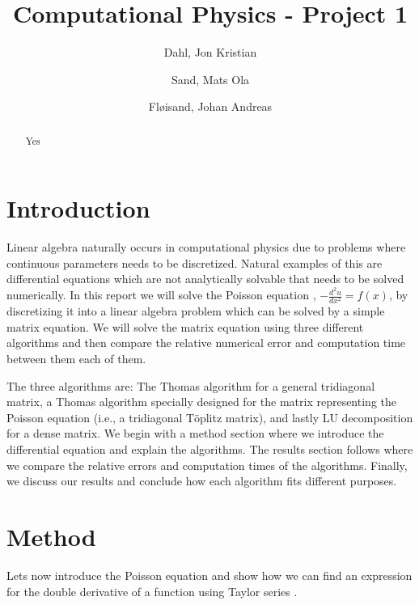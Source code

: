 \documentclass{emulateapj}
\begin{document}
\title{Computational Physics - Project 1}

\author{
  Dahl, Jon Kristian \\
  \and
  Sand, Mats Ola \\
  \and
  Fløisand, Johan Andreas \\
}

\begin{abstract}
Yes
\end{abstract}
 
\section{Introduction}
Linear algebra naturally occurs in computational physics due to problems where continuous parameters needs to be discretized. Natural examples of this are differential equations which are not analytically solvable that needs to be solved numerically. In this report we will solve the Poisson equation \cite[Chapter 13]{matmet}, \(-\frac{d^2u}{dx^2} = f(x)\), by discretizing it into a linear algebra problem which can be solved by a simple matrix equation. We will solve the matrix equation using three different algorithms and then compare the relative numerical error and computation time between them each of them.

The three algorithms are: The Thomas algorithm for a general tridiagonal matrix, a Thomas algorithm specially designed for the matrix representing the Poisson equation (i.e., a tridiagonal T\"{o}plitz matrix), and lastly LU decomposition for a dense matrix.
\newline
\newline
We begin with a method section where we introduce the differential equation and explain the algorithms. The results section follows where we compare the relative errors and computation times of the algorithms. Finally, we discuss our results and conclude how each algorithm fits different purposes.
\section{Method}
Lets now introduce the Poisson equation and show how we can find an expression for the double derivative of a function using Taylor series \cite[Chapter 11]{kalkulus}.
\end{document}
